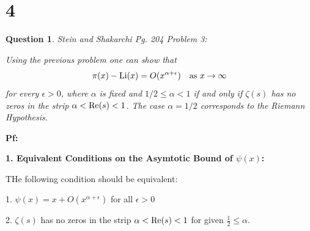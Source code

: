 \documentclass{article}
\newtheorem{question}{Question}
\begin{document}
\section*{4}
\begin{myBox}[]{}
    \begin{question}
        Stein and Shakarchi Pg. 204 Problem 3:

        Using the previous problem one can show that 
        $$\pi(x)-\textmd{Li}(x)=O(x^{\alpha+\epsilon})\quad \textmd{as }x\rightarrow\infty$$
        for every $\epsilon>0$, where $\alpha$ is fixed and $1/2\leq \alpha<1$ if and only if $\zeta(s)$ has no zeros in the strip $\alpha<\textmd{Re}(s)<1$. The case $\alpha=1/2$ corresponds to the Riemann Hypothesis.     
    \end{question}
\end{myBox}

\textbf{Pf:}

\textbf{1. Equivalent Conditions on the Asymtotic Bound of $\psi(x)$:}

THe following condition should be equivalent:

1. $\psi(x)=x+O(x^{\alpha+\epsilon})$ for all $\epsilon>0$

2. $\zeta(s)$ has no zeros in the strip $\alpha<\textmd{Re}(s)<1$ for given $\frac{1}{2}\leq \alpha$.
\end{document}
